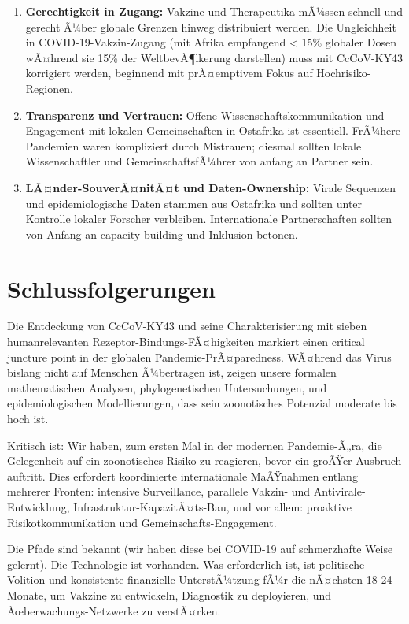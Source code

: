 ﻿\documentclass[11pt,a4paper]{article}
\theoremstyle{definition}
\begin{document}
\begin{enumerate}
\item \textbf{Gerechtigkeit in Zugang:} Vakzine und Therapeutika mÃ¼ssen schnell und gerecht Ã¼ber globale Grenzen hinweg distribuiert werden. Die Ungleichheit in COVID-19-Vakzin-Zugang (mit Afrika empfangend < 15\% globaler Dosen wÃ¤hrend sie 15\% der WeltbevÃ¶lkerung darstellen) muss mit CcCoV-KY43 korrigiert werden, beginnend mit prÃ¤emptivem Fokus auf Hochrisiko-Regionen.

\item \textbf{Transparenz und Vertrauen:} Offene Wissenschaftskommunikation und Engagement mit lokalen Gemeinschaften in Ostafrika ist essentiell. FrÃ¼here Pandemien waren kompliziert durch Mistrauen; diesmal sollten lokale Wissenschaftler und GemeinschaftsfÃ¼hrer von anfang an Partner sein.

\item \textbf{LÃ¤nder-SouverÃ¤nitÃ¤t und Daten-Ownership:} Virale Sequenzen und epidemiologische Daten stammen aus Ostafrika und sollten unter Kontrolle lokaler Forscher verbleiben. Internationale Partnerschaften sollten von Anfang an capacity-building und Inklusion betonen.
\end{enumerate}

\section{Schlussfolgerungen}

Die Entdeckung von CcCoV-KY43 und seine Charakterisierung mit sieben humanrelevanten Rezeptor-Bindungs-FÃ¤higkeiten markiert einen critical juncture point in der globalen Pandemie-PrÃ¤paredness. WÃ¤hrend das Virus bislang nicht auf Menschen Ã¼bertragen ist, zeigen unsere formalen mathematischen Analysen, phylogenetischen Untersuchungen, und epidemiologischen Modellierungen, dass sein zoonotisches Potenzial moderate bis hoch ist.

Kritisch ist: Wir haben, zum ersten Mal in der modernen Pandemie-Ã„ra, die Gelegenheit auf ein zoonotisches Risiko zu reagieren, bevor ein groÃŸer Ausbruch auftritt. Dies erfordert koordinierte internationale MaÃŸnahmen entlang mehrerer Fronten: intensive Surveillance, parallele Vakzin- und Antivirale-Entwicklung, Infrastruktur-KapazitÃ¤ts-Bau, und vor allem: proaktive Risikotkommunikation und Gemeinschafts-Engagement.

Die Pfade sind bekannt (wir haben diese bei COVID-19 auf schmerzhafte Weise gelernt). Die Technologie ist vorhanden. Was erforderlich ist, ist politische Volition und konsistente finanzielle UnterstÃ¼tzung fÃ¼r die nÃ¤chsten 18-24 Monate, um Vakzine zu entwickeln, Diagnostik zu deployieren, und Ãœberwachungs-Netzwerke zu verstÃ¤rken.
\end{document}
